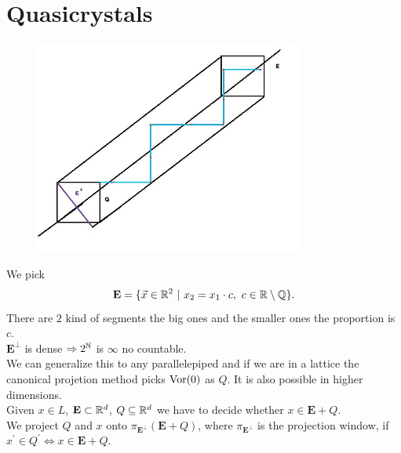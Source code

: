 \chapter{Quasicrystals}
\begin{figure}[h] %
\centering
\includegraphics[width=250pt]{./graphics/Quasi.jpg}
\end{figure}
We pick
$$\textbf{E}=\{\vec{x}\in\RR^2\ |\ x_2=x_1\cdot c,\ c\in\RR\setminus\QQ\}.$$
There are $2$ kind of segments the big ones and the smaller ones the proportion is $c$.\smallskip\\
$\textbf{E}^{\bot}$ is dense $\Rightarrow 2^{\mathbb{N}}$ is $\infty$ no countable.\smallskip\\
We can generalize this to any parallelepiped and if we are in a lattice the canonical projetion method picks $\operatorname{Vor}(0)$ as $Q$. It is also possible in higher dimensions.\smallskip\\
Given $x\in L$, $\textbf{E}\subset \mathbb{R}^d$, $Q\subseteq\mathbb{R}^d$ we have to decide whether $x\in\mathbf{E}+Q$.\smallskip\\
We project $Q$ and $x$ onto $\pi_{\textbf{E}^{\bot}}(\mathbf{E}+Q)$, where $\pi_{\textbf{E}^{\bot}}$ is the projection window, if $x^{'}\in Q^{'}\Leftrightarrow x\in\mathbf{E}+Q$.